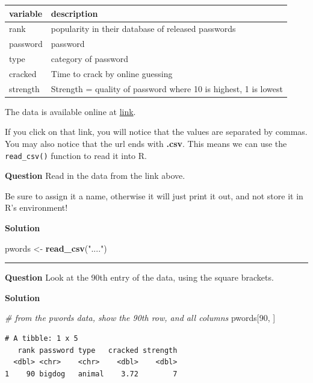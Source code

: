 \documentclass[]{book}
\newenvironment{Shaded}{\begin{snugshade}}{\end{snugshade}}
\newcommand{\CommentTok}[1]{\textcolor[rgb]{0.56,0.35,0.01}{\textit{#1}}}
\newcommand{\DecValTok}[1]{\textcolor[rgb]{0.00,0.00,0.81}{#1}}
\newcommand{\KeywordTok}[1]{\textcolor[rgb]{0.13,0.29,0.53}{\textbf{#1}}}
\newcommand{\NormalTok}[1]{#1}
\newcommand{\StringTok}[1]{\textcolor[rgb]{0.31,0.60,0.02}{#1}}
\begin{document}
\begin{tabular}{l|l}
\hline
variable & description\\
\hline
rank & popularity in their database of released passwords\\
\hline
password & password\\
\hline
type & category of password\\
\hline
cracked & Time to crack by online guessing\\
\hline
strength & Strength = quality of password where 10 is highest, 1 is lowest\\
\hline
\end{tabular}

The data is available online at \url{link}.

If you click on that link, you will notice that the values are separated by commas. You may also notice that the url ends with \textbf{.csv}. This means we can use the \texttt{read\_csv()} function to read it into R.

\textbf{Question }
Read in the data from the link above.

Be sure to assign it a name, otherwise it will just print it out, and not store it in R's environment!

\textbf{Solution }

\begin{Shaded}
\begin{Highlighting}[]
\NormalTok{pwords <-}\StringTok{ }\KeywordTok{read_csv}\NormalTok{(}\StringTok{"...."}\NormalTok{)}
\end{Highlighting}
\end{Shaded}

\begin{center}\rule{0.5\linewidth}{0.5pt}\end{center}

\textbf{Question }
Look at the 90th entry of the data, using the square brackets.

\textbf{Solution }

\begin{Shaded}
\begin{Highlighting}[]
\CommentTok{# from the pwords data, show the 90th row, and all columns}
\NormalTok{pwords[}\DecValTok{90}\NormalTok{, ]}
\end{Highlighting}
\end{Shaded}

\begin{verbatim}
# A tibble: 1 x 5
   rank password type   cracked strength
  <dbl> <chr>    <chr>    <dbl>    <dbl>
1    90 bigdog   animal    3.72        7
\end{verbatim}
\end{document}
